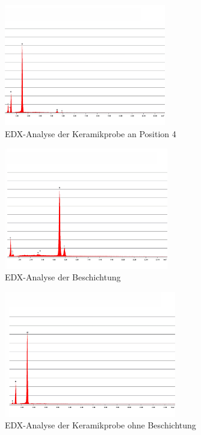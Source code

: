 \documentclass[12pt,english,ngerman]{scrartcl}
\begin{document}
\begin{figure}[H]
	\begin{center}
		\includegraphics[width =\textwidth,height=5.3cm]{./figures/edx4.png}
	\end{center}
	\caption{EDX-Analyse der Keramikprobe an Position 4~\cite{sein_foto}
	}\label{fig:position4}
\end{figure}
\begin{figure}[H]
	\begin{center}
		\includegraphics[width =\textwidth,height=5.3cm]{./figures/beschichtung.png}
	\end{center}
	\caption{EDX-Analyse der Beschichtung~\cite{sein_foto}
	}\label{fig:beschichtung}
\end{figure}
\begin{figure}[H]
	\begin{center}
		\includegraphics[width =\textwidth,height=5.5cm]{./figures/keramik.png}
	\end{center}
	\caption{EDX-Analyse der Keramikprobe ohne Beschichtung~\cite{sein_foto}
	}\label{fig:keramik}
\end{figure}
\end{document}
